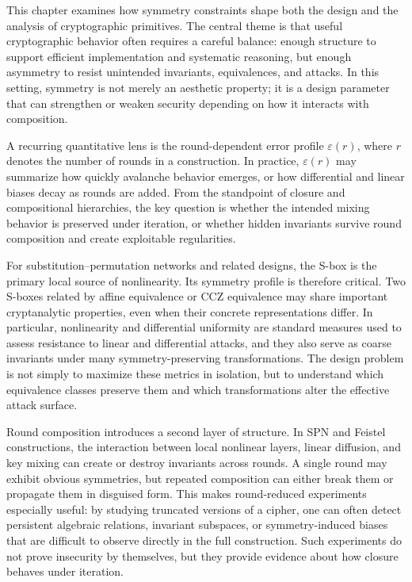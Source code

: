 This chapter examines how symmetry constraints shape both the design and the analysis of cryptographic primitives. The central theme is that useful cryptographic behavior often requires a careful balance: enough structure to support efficient implementation and systematic reasoning, but enough asymmetry to resist unintended invariants, equivalences, and attacks. In this setting, symmetry is not merely an aesthetic property; it is a design parameter that can strengthen or weaken security depending on how it interacts with composition.

A recurring quantitative lens is the round-dependent error profile \(\varepsilon(r)\), where \(r\) denotes the number of rounds in a construction. In practice, \(\varepsilon(r)\) may summarize how quickly avalanche behavior emerges, or how differential and linear biases decay as rounds are added. From the standpoint of closure and compositional hierarchies, the key question is whether the intended mixing behavior is preserved under iteration, or whether hidden invariants survive round composition and create exploitable regularities.

For substitution--permutation networks and related designs, the S-box is the primary local source of nonlinearity. Its symmetry profile is therefore critical. Two S-boxes related by affine equivalence or CCZ equivalence may share important cryptanalytic properties, even when their concrete representations differ. In particular, nonlinearity and differential uniformity are standard measures used to assess resistance to linear and differential attacks, and they also serve as coarse invariants under many symmetry-preserving transformations. The design problem is not simply to maximize these metrics in isolation, but to understand which equivalence classes preserve them and which transformations alter the effective attack surface.

Round composition introduces a second layer of structure. In SPN and Feistel constructions, the interaction between local nonlinear layers, linear diffusion, and key mixing can create or destroy invariants across rounds. A single round may exhibit obvious symmetries, but repeated composition can either break them or propagate them in disguised form. This makes round-reduced experiments especially useful: by studying truncated versions of a cipher, one can often detect persistent algebraic relations, invariant subspaces, or symmetry-induced biases that are difficult to observe directly in the full construction. Such experiments do not prove insecurity by themselves, but they provide evidence about how closure behaves under iteration.

